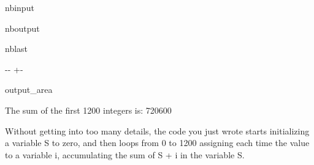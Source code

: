 \documentclass[letterpaper,10pt,english]{sphinxmanual}
\begin{document}
\begin{sphinxuseclass}{nbinput}
{
\begin{sphinxVerbatim}[commandchars=\\\{\}]
\llap{\color{nbsphinxin}[8]:\,\hspace{\fboxrule}\hspace{\fboxsep}}

  
    
        

 
\end{sphinxVerbatim}
}

\end{sphinxuseclass}
\begin{sphinxuseclass}{nboutput}
\begin{sphinxuseclass}{nblast}
{

\kern-\sphinxverbatimsmallskipamount\kern-\baselineskip
\kern+\FrameHeightAdjust\kern-\fboxrule
\vspace{\nbsphinxcodecellspacing}

\begin{sphinxuseclass}{output_area}
\begin{sphinxuseclass}{}


\begin{sphinxVerbatim}[commandchars=\\\{\}]
The sum of the first 1200 integers is:  720600
\end{sphinxVerbatim}



\end{sphinxuseclass}
\end{sphinxuseclass}
}

\end{sphinxuseclass}
\end{sphinxuseclass}
\sphinxAtStartPar
Without getting into too many details, the code you just wrote starts initializing a variable S to zero, and then loops from 0 to 1200 assigning each time the value to a variable i, accumulating the sum of S + i in the variable S.
\end{document}
